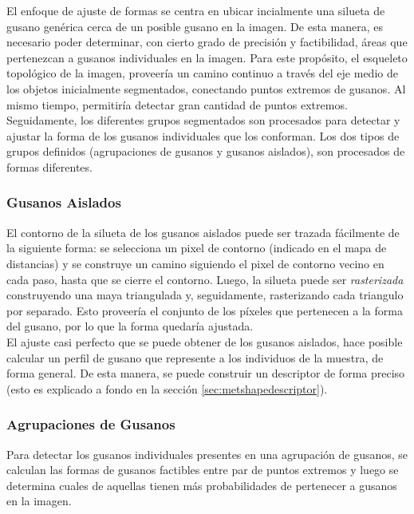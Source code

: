 El enfoque de ajuste de formas se centra en ubicar incialmente una silueta de gusano gen\'erica 
cerca de un posible gusano en la imagen. De esta manera, es necesario poder determinar, con cierto grado
de precisi\'on y factibilidad, \'areas que pertenezcan a gusanos individuales en la imagen. Para este prop\'osito,
el esqueleto topol\'ogico de la imagen, proveer\'ia un camino continuo a trav\'es del eje medio
de los objetos inicialmente segmentados, conectando puntos extremos de gusanos. Al mismo tiempo, permitir\'ia
detectar gran cantidad de puntos extremos.\\

Seguidamente, los diferentes grupos segmentados son procesados para detectar 
y ajustar la forma de los gusanos individuales que los conforman.
Los dos tipos de grupos definidos (agrupaciones de gusanos y gusanos aislados),
son procesados de formas diferentes. 

\subsubsection*{Gusanos Aislados}
El contorno de la silueta de los gusanos aislados puede ser trazada f\'acilmente de 
la siguiente forma: se selecciona un pixel de contorno (indicado en el mapa de distancias)
y se construye un camino siguiendo el pixel de contorno vecino en cada paso, hasta que
se cierre el contorno. Luego, la silueta puede ser \emph{rasterizada} construyendo 
una maya triangulada y, seguidamente, rasterizando cada triangulo por separado. Esto
proveer\'ia el conjunto de los p\'ixeles que pertenecen a la forma del gusano, por lo que
la forma quedar\'ia ajustada.\\
El ajuste casi perfecto que se puede obtener de los gusanos aislados, hace posible
calcular un perfil de gusano que represente a los individuos de la muestra, de forma
general. De esta manera, se puede construir un descriptor de forma preciso (esto 
es explicado a fondo en la secci\'on \ref{sec:metshapedescriptor}).

\subsubsection*{Agrupaciones de Gusanos}
Para detectar los gusanos individuales presentes en una agrupaci\'on de gusanos, 
se calculan las formas de gusanos factibles entre par de puntos extremos y luego 
se determina cuales de aquellas tienen m\'as probabilidades de pertenecer a gusanos 
en la imagen. \\

